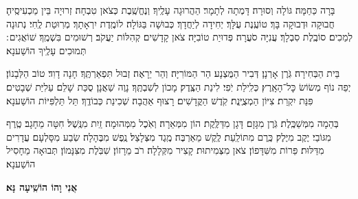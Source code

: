 \documentclass[twoside, openany, parskip=half, 11pt]{book}
\begin{document}


בָּרָה כַּחַמָּה׃ גּוֹלָה וְסוּרָה׃ דָּמְתָה לְתָמָר׃ הַהֲרוּגָה עָלֶֽיךָ׃ וְנֶחֱשֶֽׁבֶת כְּצֹאן טִבְחָה׃ זְרוּיָה בֵּין מַכְעִיסֶֽיהָ׃ חֲבוּקָה וּדְבוּקָה בָּךְ׃ טוֹעֶֽנֶת עֻלָּךְ׃ יְחִידָה לְיַחֲדָךְ׃ כְּבוּשָׁה בַּגּוֹלָה׃ לוֹמֶֽדֶת יִרְאָתָךְ׃ מְרֽוּטַת לֶֽחִי׃ נְתוּנָה לְמַכִים׃ סוֹבֶֽלֶת סִבְלָךְ׃ עֲנִיָּה סֹעֲרָה׃ פְּדוּיַת טוֹבִיָּה׃ צֹאן קָדָשִׁים׃ קְהִלּוֹת יַעֲקֹב׃ רְשׁוּמִים בִּשְׁמֶֽךָ׃
שׁוֹאֲגִים ׃
תְּמוּכִים עָלֶֽיךָ הוֹשַׁענָא׃


בֵּית הַבְּחִירָה׃ גֹּֽרֶן אָרְנָן׃ דְּבִיר הַמֻּצְנָע׃ הַר הַמּוֹרִיָּה׃ וְהַר יֵרָאֶה׃ זְבוּל תִּפְאַרְתֶּֽךָ׃ חָנָה דָוִד׃ טוֹב הַלְּבָנוֹן׃ יְפֵה נוֹף מְשׂוֹשׂ כׇּל־הָאָֽרֶץ׃ כְּלִֽילַת יֹֽפִי׃ לִינַת הַצֶּֽדֶק׃ מָכוֹן לְשִׁבְתֶּֽךָ׃ נָוֶה שַׁאֲנָן׃ סֻכַּת שָׁלֵם׃ עַלִיַּת שְׁבָטִים׃ פִּנַּת יִקְרַת׃ צִיּוֹן הַמְצֻיֶּֽנֶת׃ קֹֽדֶשׁ הַקֳּדָשִׁים׃ רָצוּף אַהֲבָה׃
שְׁכִינַת כְּבוֹדֶֽךָ׃
תֵּל תַּלְפִּיּוֹת הוֹשַׁענָא׃


בְּהֵמָה מִמְּשַׁכֶּֽלֶת׃ גֹּֽרֶן מִגָּזָם׃ דָּגָן מִדַּלֶּֽקֶת׃ הוֹן מִמְּאֵרָה׃ וְאֹֽכֶל מִמְּהוּמָה׃ זַֽיִת מִנֶּֽשֶׁל׃ חִטָּה מֵחָגָב׃ טֶֽרֶף מִגּוֹבַי׃ יֶקֶב מִיֶּלֶק׃ כֶּֽרֶם מִתּוֹלַֽעַת׃ לֶֽקֶשׁ מֵאַרְבֶּה׃ מֶֽגֶד מִצְּלָצַל׃ נֶֽפֶשׁ מִבֶּהָלָה׃ שֽׂבַע מִסָּלְעָם׃ עֲדָרִים מִדַּלּוּת׃ פֵּרוֹת מִשִּׁדָּפוֹן׃ צֹאן מִצְּמִיתוּת׃ קָצִיר מִקְּלָלָה׃ רֹב מֵרָזוֹן׃
שִׁבֹּֽלֶת מִצִּנָּמוֹן׃
תְּבוּאָה מֵחָסִיל הוֹשַׁענָא׃


\label{ani vho}
\begin{large}
\textbf{אֲנִי וָהוֹ הוֹשִֽׁיעָה נָּא׃}
\end{large}
\end{document}
